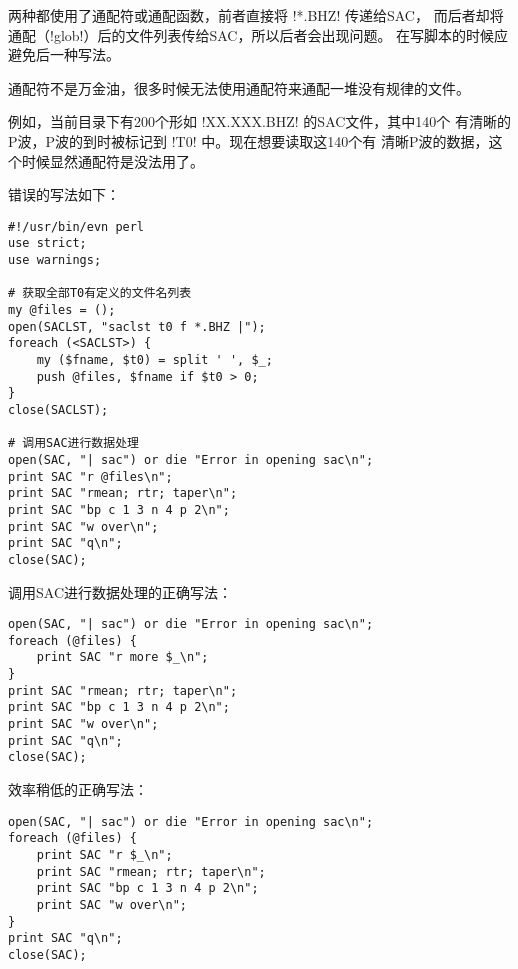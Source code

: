 两种都使用了通配符或通配函数，前者直接将 !*.BHZ! 传递给SAC，
而后者却将通配（!glob!）后的文件列表传给SAC，所以后者会出现问题。
在写脚本的时候应避免后一种写法。

通配符不是万金油，很多时候无法使用通配符来通配一堆没有规律的文件。

例如，当前目录下有200个形如 !XX.XXX.BHZ! 的SAC文件，其中140个
有清晰的P波，P波的到时被标记到 !T0! 中。现在想要读取这140个有
清晰P波的数据，这个时候显然通配符是没法用了。

错误的写法如下：
\begin{verbatim}
#!/usr/bin/evn perl
use strict;
use warnings;

# 获取全部T0有定义的文件名列表
my @files = ();
open(SACLST, "saclst t0 f *.BHZ |");
foreach (<SACLST>) {
    my ($fname, $t0) = split ' ', $_;
    push @files, $fname if $t0 > 0;
}
close(SACLST);

# 调用SAC进行数据处理
open(SAC, "| sac") or die "Error in opening sac\n";
print SAC "r @files\n";
print SAC "rmean; rtr; taper\n";
print SAC "bp c 1 3 n 4 p 2\n";
print SAC "w over\n";
print SAC "q\n";
close(SAC);
\end{verbatim}

调用SAC进行数据处理的正确写法：
\begin{verbatim}
open(SAC, "| sac") or die "Error in opening sac\n";
foreach (@files) {
    print SAC "r more $_\n";
}
print SAC "rmean; rtr; taper\n";
print SAC "bp c 1 3 n 4 p 2\n";
print SAC "w over\n";
print SAC "q\n";
close(SAC);
\end{verbatim}

效率稍低的正确写法：
\begin{verbatim}
open(SAC, "| sac") or die "Error in opening sac\n";
foreach (@files) {
    print SAC "r $_\n";
    print SAC "rmean; rtr; taper\n";
    print SAC "bp c 1 3 n 4 p 2\n";
    print SAC "w over\n";
}
print SAC "q\n";
close(SAC);
\end{verbatim}
